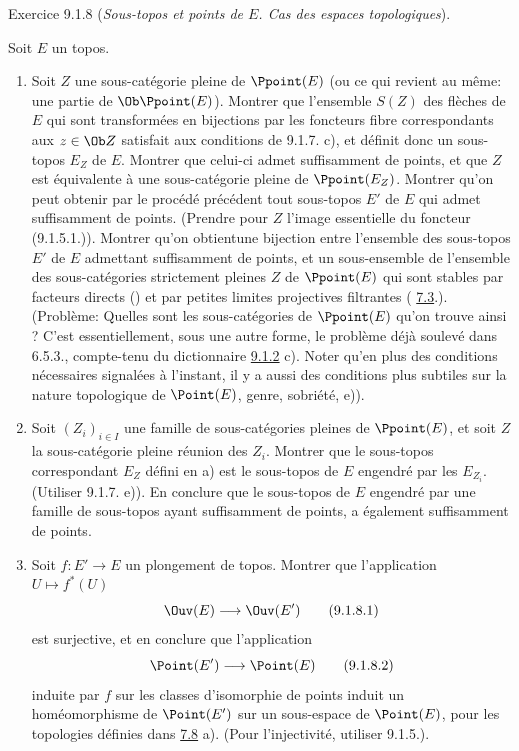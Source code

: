 \documentclass[10pt]{../fichiers-configuration-latex/smfart}
\begin{document}
\begin{enonce*}[remark]{Exercice 9.1.8}
(\emph{Sous-topos et points de $E$. Cas des espaces topologiques}).

Soit $E$ un topos.
\begin{enumerate}
\renewcommand{\theenumi}{\alph{enumi}}
\renewcommand{\labelenumi}{\theenumi)}
\item Soit $Z$ une sous-catégorie pleine de $\Ppoint(E)$ (ou ce qui
revient au même: une partie de $\Ob \Ppoint(E)$). Montrer que
l'ensemble $S(Z)$ des flèches de $E$ qui sont transformées en
bijections par les foncteurs fibre correspondants aux $z\in \Ob Z$
satisfait aux conditions de 9.1.7. c), et définit donc un sous-topos
$E_Z$ de $E$. Montrer que celui-ci admet suffisamment de points, et
que $Z$ est équivalente à une sous-catégorie pleine de
$\Ppoint(E_Z)$. Montrer qu'on peut obtenir par le procédé précédent
tout sous-topos $E'$ de $E$ qui admet suffisamment de points.
(Prendre pour $Z$ l'image essentielle du foncteur (9.1.5.1.)).
Montrer qu'on obtient\pageoriginale une bijection entre l'ensemble
des sous-topos $E'$ de $E$ admettant suffisamment de points, et un
sous-ensemble de l'ensemble des sous-catégories strictement pleines
$Z$ de $\Ppoint(E)$ qui sont stables par facteurs directs
() et par petites limites projectives filtrantes (\cf
\hyperref[IV.subsec7.3]{7.3}.). (Problème: Quelles sont les sous-catégories de
$\Ppoint(E)$ qu'on trouve ainsi ? C'est essentiellement, sous une
autre forme, le problème déjà soulevé dans 6.5.3., compte-tenu du
dictionnaire \hyperref[IV.rem9.1.2]{9.1.2} c). Noter qu'en plus des conditions
nécessaires signalées à l'instant, il y a aussi des conditions plus
subtiles sur la nature topologique de $\Point(E)$, genre, sobriété,
\cf e)).

\item Soit $(Z_i)_{i\in I}$ une famille de sous-catégories pleines de
$\Ppoint(E)$, et soit $Z$ la sous-catégorie pleine réunion des
$Z_i$. Montrer que le sous-topos correspondant $E_Z$ défini en a)
est le sous-topos de $E$ engendré par les $E_{Z_i}$. (Utiliser
9.1.7. e)). En conclure que le sous-topos de $E$ engendré par une
famille de sous-topos ayant suffisamment de points, a également
suffisamment de points.

\item Soit $f:E'\rightarrow E$ un plongement de topos. Montrer que
l'application $U\mapsto f^{\ast}(U)$
\begin{equation*}
\Ouv(E)\longrightarrow \Ouv(E')\tag{9.1.8.1}
\end{equation*}
est surjective, et en conclure que l'application
\begin{equation*}
\Point(E')\longrightarrow \Point(E)\tag{9.1.8.2}
\end{equation*}
induite par $f$ sur les classes d'isomorphie de points induit un
homéomorphisme de $\Point(E')$ sur un sous-espace de $\Point(E)$,
pour les topologies définies dans \hyperref[IV.exer7.8]{7.8} a). (Pour
l'injectivité, utiliser 9.1.5.).


\end{enumerate}
\end{enonce*}
\end{document}
